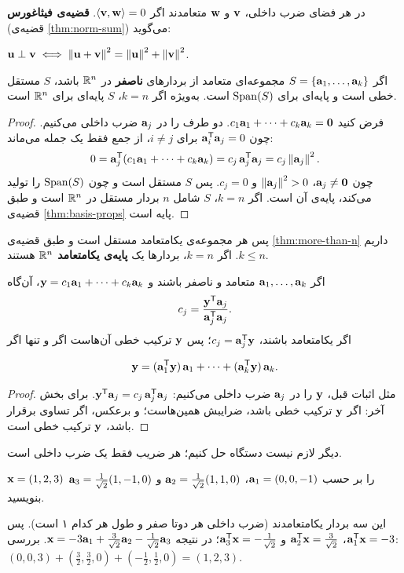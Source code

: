 در هر فضای ضرب داخلی، $\mathbf{v}$ و $\mathbf{w}$ متعامدند اگر $\left\langle \mathbf{v},\mathbf{w}\right\rangle=0$. \textbf{قضیه‌ی فیثاغورس} (قضیه‌ی \ref{thm:norm-sum}) می‌گوید:
\begin{keyformula}
\centering
$\mathbf{u}\perp\mathbf{v}\iff\left\lVert \mathbf{u}+\mathbf{v}\right\rVert^2=\left\lVert \mathbf{u}\right\rVert^2+\left\lVert \mathbf{v}\right\rVert^2$.
\end{keyformula}

\begin{theorem}\label{thm:orth-indep}
اگر $S=\{\mathbf{a}_1,\dots,\mathbf{a}_k\}$ مجموعه‌ای متعامد از بردارهای \textbf{ناصفر} در $\mathbb{R}^n$ باشد، $S$ مستقل خطی  است و پایه‌ای برای $\operatorname{Span}(S)$ است. به‌ویژه اگر $k=n$، $S$ پایه‌ای برای $\mathbb{R}^n$ است.
\end{theorem}
\begin{proof}
فرض کنید $c_1\mathbf{a}_1+\dots+c_k\mathbf{a}_k=\mathbf{0}$. دو طرف را در $\mathbf{a}_j$ ضرب داخلی می‌کنیم. چون $\mathbf{a}_i^{\mathsf{T}}\mathbf{a}_j=0$ برای $i\neq j$، از جمع فقط یک جمله می‌ماند:
\[
0=\mathbf{a}_j^{\mathsf{T}}(c_1\mathbf{a}_1+\dots+c_k\mathbf{a}_k)=c_j\,\mathbf{a}_j^{\mathsf{T}}\mathbf{a}_j=c_j\left\lVert \mathbf{a}_j\right\rVert^2 .
\]
چون $\mathbf{a}_j\neq\mathbf{0}$، $\left\lVert \mathbf{a}_j\right\rVert^2>0$ و $c_j=0$. پس $S$ مستقل است و چون $\operatorname{Span}(S)$ را تولید می‌کند، پایه‌ی آن است. اگر $k=n$، $S$ شامل $n$ بردار مستقل در $\mathbb{R}^n$ است و طبق قضیه‌ی \ref{thm:basis-props} پایه است.
\end{proof}

\begin{note}
پس هر مجموعه‌ی یکامتعامد مستقل است و طبق قضیه‌ی \ref{thm:more-than-n} داریم $k\le n$. اگر $k=n$، بردارها یک \textbf{پایه‌ی یکامتعامد} $\mathbb{R}^n$ هستند.
\end{note}

\begin{corollary}\label{cor:orth-coeffs}
اگر $\mathbf{a}_1,\dots,\mathbf{a}_k$ متعامد و ناصفر باشند و $\mathbf{y}=c_1\mathbf{a}_1+\dots+c_k\mathbf{a}_k$، آن‌گاه
\[
c_j=\frac{\mathbf{y}^{\mathsf{T}}\mathbf{a}_j}{\mathbf{a}_j^{\mathsf{T}}\mathbf{a}_j}.
\]
اگر یکامتعامد باشند، $c_j=\mathbf{a}_j^{\mathsf{T}}\mathbf{y}$؛ پس $\mathbf{y}$ ترکیب خطی آن‌هاست اگر و تنها اگر
\begin{keyformula}
\[
\mathbf{y}=(\mathbf{a}_1^{\mathsf{T}}\mathbf{y})\,\mathbf{a}_1+\dots+(\mathbf{a}_k^{\mathsf{T}}\mathbf{y})\,\mathbf{a}_k .
\]
\end{keyformula}
\end{corollary}
\begin{proof}
مثل اثبات قبل، $\mathbf{y}$ را در $\mathbf{a}_j$ ضرب داخلی می‌کنیم: $\mathbf{y}^{\mathsf{T}}\mathbf{a}_j=c_j\,\mathbf{a}_j^{\mathsf{T}}\mathbf{a}_j$. برای بخش آخر: اگر $\mathbf{y}$ ترکیب خطی باشد، ضرایبش همین‌هاست؛ و برعکس، اگر تساوی برقرار باشد، $\mathbf{y}$ ترکیب خطی است.
\end{proof}

دیگر لازم نیست دستگاه حل کنیم؛ هر ضریب فقط یک ضرب داخلی است.

\begin{example}
$\mathbf{x}=(1,2,3)$ را بر حسب
$\mathbf{a}_1=(0,0,-1)$، $\mathbf{a}_2=\frac1{\sqrt2}(1,1,0)$ و $\mathbf{a}_3=\frac1{\sqrt2}(1,-1,0)$
بنویسید.
\end{example}
\begin{solution}
این سه بردار یکامتعامدند (ضرب داخلی هر دوتا صفر و طول هر کدام ۱ است). پس
$\mathbf{a}_1^{\mathsf{T}}\mathbf{x}=-3$، $\mathbf{a}_2^{\mathsf{T}}\mathbf{x}=\frac{3}{\sqrt2}$ و $\mathbf{a}_3^{\mathsf{T}}\mathbf{x}=-\frac{1}{\sqrt2}$؛ در نتیجه $\mathbf{x}=-3\mathbf{a}_1+\frac{3}{\sqrt2}\mathbf{a}_2-\frac{1}{\sqrt2}\mathbf{a}_3$. بررسی: $(0,0,3)+(\frac32,\frac32,0)+(-\frac12,\frac12,0)=(1,2,3)$.
\end{solution}

